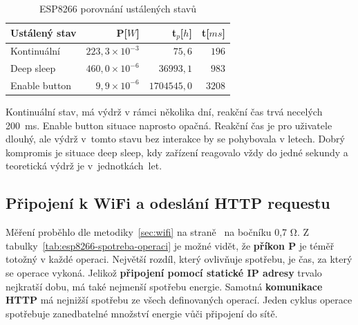 \documentclass[a4paper, 12pt]{report}
\begin{document}
    \begin{table}[h!]
        \centering
        \caption{ESP8266 porovnání ustálených stavů}
        \begin{tabular}{||l|r r r||}
            \hline
            Ustálený stav & P[$W$]                 & t$_{p}$[$h$]  & t[$ms$] \\
            \hline
            Kontinuální   & $223,3 \times 10^{-3}$ & $75,6$        & $196$   \\
            Deep sleep    & $460,0 \times 10^{-6}$ & $36 993,1$    & $983$   \\
            Enable button & $9,9\times 10^{-6}$    & $1 704 545,0$ & $3 208$ \\
            \hline
        \end{tabular}
        \label{tab:esp8266-klidove-rezimy-porovnani}
    \end{table}
    Kontinuální stav, má výdrž v rámci několika dní, reakční čas trvá necelých 200~ms.
    Enable button situace naprosto opačná.
    Reakční čas je pro uživatele dlouhý, ale výdrž v~tomto stavu bez interakce by se pohybovala v letech.
    Dobrý kompromis je situace deep sleep, kdy zařízení reagovalo vždy do jedné sekundy a teoretická výdrž je v~jednotkách~let.

    \subsection{Připojení k WiFi a odeslání HTTP requestu}
    Měření proběhlo dle metodiky~\ref{sec:wifi} na straně~\pageref{sec:wifi} na bočníku 0,7 \si{\ohm}.
    Z tabulky~\ref{tab:esp8266-spotreba-operaci} je možné vidět, že \textbf{příkon P} je téměř totožný v každé operaci.
    Největší rozdíl, který ovlivňuje spotřebu, je čas, za který se operace vykoná.
    Jelikož \textbf{připojení pomocí statické IP adresy} trvalo nejkratší dobu, má také nejmenší spotřebu energie.
    Samotná \textbf{komunikace HTTP} má nejnižší spotřebu ze všech definovaných operací. Jeden cyklus operace spotřebuje zanedbatelné množství energie vůči připojení do sítě.
    \newpage
\end{document}
